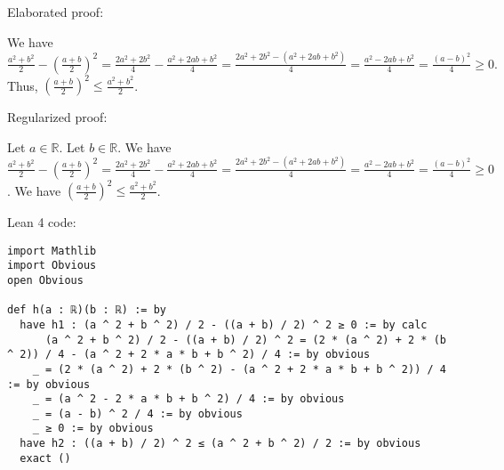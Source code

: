\documentclass{article}
\begin{document}
Elaborated proof:
\begin{tcolorbox}[colback=green!10, width=\linewidth]
We have
$ \frac{a^2+b^2}{2} - \left(\frac{a+b}{2}\right)^2 = \frac{2a^2+2b^2}{4} - \frac{a^2+2ab+b^2}{4} = \frac{2a^2+2b^2-(a^2+2ab+b^2)}{4} = \frac{a^2-2ab+b^2}{4} = \frac{(a-b)^2}{4} \ge 0. $
Thus, $\left(\frac{a+b}{2}\right)^2 \leq \frac{a^2+b^2}{2}$.
\end{tcolorbox}

Regularized proof:
\begin{tcolorbox}[colback=red!10, width=\linewidth]
Let $a\in\mathbb{R}$.
Let $b\in\mathbb{R}$.
We have $\frac{a^2+b^2}{2} - {\left(\frac{a+b}{2}\right)}^2 = \frac{2a^2+2b^2}{4} - \frac{a^2+2ab+b^2}{4} = \frac{2a^2+2b^2-(a^2+2ab+b^2)}{4} = \frac{a^2-2ab+b^2}{4} = \frac{{(a-b)}^2}{4} \ge 0$.
We have ${\left(\frac{a+b}{2}\right)}^2 \leq \frac{a^2+b^2}{2}$.
\end{tcolorbox}

Lean 4 code:
\begin{tcolorbox}[colback=white!10, width=\linewidth]
\begin{lstlisting}[language=Lean4]
import Mathlib
import Obvious
open Obvious

def h(a : ℝ)(b : ℝ) := by
  have h1 : (a ^ 2 + b ^ 2) / 2 - ((a + b) / 2) ^ 2 ≥ 0 := by calc
      (a ^ 2 + b ^ 2) / 2 - ((a + b) / 2) ^ 2 = (2 * (a ^ 2) + 2 * (b ^ 2)) / 4 - (a ^ 2 + 2 * a * b + b ^ 2) / 4 := by obvious
    _ = (2 * (a ^ 2) + 2 * (b ^ 2) - (a ^ 2 + 2 * a * b + b ^ 2)) / 4 := by obvious
    _ = (a ^ 2 - 2 * a * b + b ^ 2) / 4 := by obvious
    _ = (a - b) ^ 2 / 4 := by obvious
    _ ≥ 0 := by obvious
  have h2 : ((a + b) / 2) ^ 2 ≤ (a ^ 2 + b ^ 2) / 2 := by obvious
  exact ()

\end{lstlisting}
\end{tcolorbox}
\end{document}
